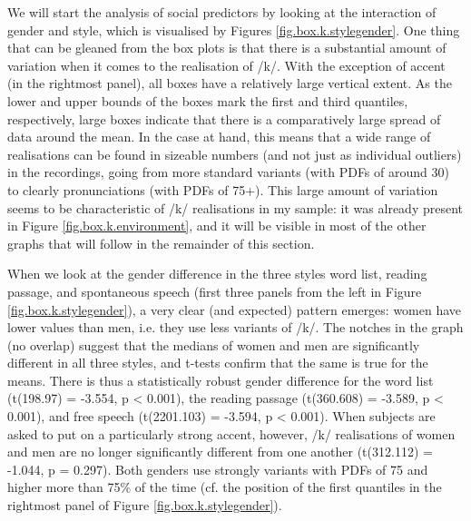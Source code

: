 We will start the analysis of social predictors by looking at the interaction of gender and style, which is visualised by Figures \ref{fig.box.k.stylegender}.
One thing that can be gleaned from the box plots is that there is a substantial amount of variation when it comes to the realisation of /k/.
With the exception of accent  (in the rightmost panel), all boxes have a relatively large vertical extent.
As the lower and upper bounds of the boxes mark the first and third quantiles, respectively, large boxes indicate that there is a comparatively large spread of data around the mean.
In the case at hand, this means that a wide range of realisations can be found in sizeable numbers (and not just as individual outliers) in the recordings, going from more standard variants (with PDFs of around 30) to clearly  pronunciations (with PDFs of 75+).
This large amount of variation seems to be characteristic of /k/ realisations in my sample: it was already present in Figure \ref{fig.box.k.environment}, and it will be visible in most of the other graphs that will follow in the remainder of this section.

When we look at the gender difference in the three styles word list, reading passage, and spontaneous speech (first three panels from the left in Figure \ref{fig.box.k.stylegender}), a very clear (and expected) pattern emerges: women have lower  values than men, i.e. they use less  variants of /k/.
The notches in the graph (no overlap) suggest that the medians of women and men are significantly different in all three styles, and t-tests confirm that the same is true for the means.
There is thus a statistically robust gender difference for the word list (t(198.97) = -3.554, p < 0.001), the reading passage (t(360.608) = -3.589, p < 0.001), and free speech (t(2201.103) = -3.594, p < 0.001).
When subjects are asked to put on a particularly strong  accent, however, /k/ realisations of women and men are no longer significantly different from one another (t(312.112) = -1.044, p = 0.297).
Both genders use strongly  variants with PDFs of 75 and higher more than 75\% of the time (cf. the position of the first quantiles in the rightmost panel of Figure \ref{fig.box.k.stylegender}).

